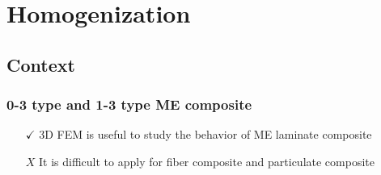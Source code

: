 \documentclass[compress]{beamer}
\begin{document}
\section{Homogenization}
\subsection{Context}

\begin{frame}\frametitle{0-3 type and 1-3 type ME composite}
\begin{itemize}[]
	\item[{\color{green} $\checkmark$}] 3D FEM is useful to study the behavior of ME laminate composite
	\item[{\color{red} $X$}] It is difficult to apply for fiber composite and particulate composite
	\end{itemize}


\end{frame}
\end{document}
